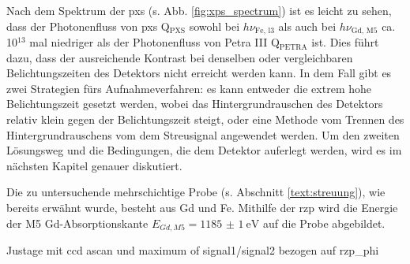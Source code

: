 \noindent
Nach dem Spektrum der \gls{pxs} (s. Abb. \ref{fig:xps_spectrum}) ist es leicht zu sehen, dass der Photonenfluss von \gls{pxs} Q$_{\text{PXS}}$ sowohl bei $h\nu_{\text{Fe, l3}}$ als auch bei $h\nu_{\text{Gd, M5}}$ ca. 10$^{13}$ mal niedriger als der Photonenfluss von Petra III Q$_\text{PETRA}$ ist. Dies führt dazu, dass der ausreichende Kontrast bei denselben oder vergleichbaren Belichtungszeiten des Detektors nicht erreicht werden kann. In dem Fall gibt es zwei Strategien fürs Aufnahmeverfahren: es kann entweder die extrem hohe Belichtungszeit gesetzt werden, wobei das Hintergrundrauschen des Detektors relativ klein gegen der Belichtungszeit steigt, oder eine Methode vom Trennen des Hintergrundrauschens vom dem Streusignal angewendet werden. Um den zweiten Lösungsweg und die Bedingungen, die dem Detektor auferlegt werden, wird es im nächsten Kapitel genauer diskutiert. 

\noindent
Die zu untersuchende mehrschichtige Probe (s. Abschnitt \ref{text:streuung}), wie bereits erwähnt wurde, besteht aus Gd und Fe. Mithilfe der \gls{rzp} wird die Energie der M5 Gd-Absorptionskante $E_{Gd, M5} = \SI{1185(1)}{\eV}$ \cite[Abb. 6(a)]{prieto_x-ray_2005} auf die Probe abgebildet.

Justage mit ccd ascan und maximum of signal1/signal2 bezogen auf rzp\_phi 


